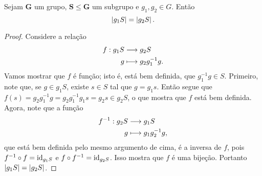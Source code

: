 \begin{prop}
Sejam $\bm G$ um grupo, $\bm S \leq \bm G$ um subgrupo e $g_1,g_2 \in G$. Então
	\begin{equation*}
	\left\vert{g_1S}\right\vert=\left\vert{g_2S}\right\vert.
	\end{equation*}
\end{prop}
\begin{proof}
Considere a relação
	\begin{align*}
	{f}: {g_1S} &\longrightarrow {g_2S} \\{g} &\longmapsto {g_2g_1^{-1}g}.
	\end{align*}
Vamos mostrar que $f$ é função; isto é, está bem definida, que $g_1^{-1}g \in S$. Primeiro, note que, se $g \in g_1S$, existe $s\in S$ tal que $g=g_1s$. Então segue que $f(s)=g_2g_1^{-1}g=g_2g_1^{-1}g_1s=g_2s \in g_2S$, o que mostra que $f$ está bem definida. Agora, note que a função
	\begin{align*}
	{f^{-1}}: {g_2S} &\longrightarrow {g_1S} \\{g} &\longmapsto {g_1g_2^{-1}g},
	\end{align*}
que está bem definida pelo mesmo argumento de cima, é a inversa de $f$, pois $f^{-1} \circ f=\mathrm{id}_{g_1S}$ e $f \circ f^{-1}=\mathrm{id}_{g_2S}$. Isso mostra que $f$ é uma bijeção. Portanto $\left\vert{g_1S}\right\vert=\left\vert{g_2S}\right\vert$.

\end{proof}

